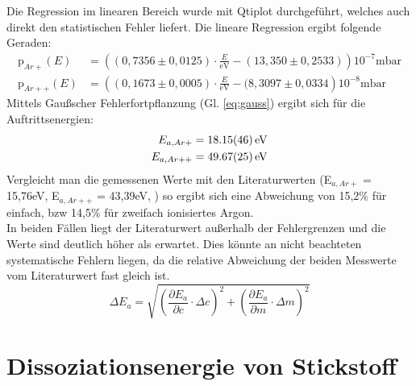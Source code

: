 Die Regression im linearen Bereich wurde mit Qtiplot durchgeführt, welches auch direkt den statistischen Fehler liefert. Die lineare Regression ergibt folgende Geraden:
\begin{align}
	\textrm{p}_{Ar+}(E) &= \left((0,7356\pm 0,0125)\cdot\frac{E}{\textrm{eV}} - (13,350\pm 0,2533)\right)10^{-7}\textrm{mbar}\\
	\textrm{p}_{Ar++}(E) &= \left((0,1673\pm 0,0005)\cdot\frac{E}{\textrm{eV}} - (8,3097\pm 0,0334\right)10^{-8}\textrm{mbar}
\end{align}
Mittels Gaußscher Fehlerfortpflanzung (Gl. \ref{eq:gauss}) ergibt sich für die Auftrittsenergien:
\begin{align}
	E_{a,Ar+} &= \SI{18,15\pm 0,46}{\electronvolt}\\
	E_{a,Ar++} &= \SI{49,67\pm 0,25}{\electronvolt}
\end{align}
Vergleicht man die gemessenen Werte mit den Literaturwerten (E$_{a,Ar+}$ = 15,76\;eV, E$_{a,Ar++}$ = 43,39\;eV, \cite{Litmap}) so ergibt sich eine Abweichung von 15,2\;\% für einfach, bzw 14,5\;\% für zweifach ionisiertes Argon.\\
In beiden Fällen liegt der Literaturwert außerhalb der Fehlergrenzen und die Werte sind deutlich höher als erwartet. Dies könnte an nicht beachteten systematische Fehlern liegen, da die relative Abweichung der beiden Messwerte vom Literaturwert fast gleich ist.\\
\begin{equation}
	\Delta E_a = \sqrt{\left(\frac{\partial E_a}{\partial c}\cdot\Delta c\right)^2 + \left(\frac{\partial E_a}{\partial m}\cdot\Delta m\right)^2}
	\label{eq:gauss}
\end{equation}

\section{Dissoziationsenergie von Stickstoff}

